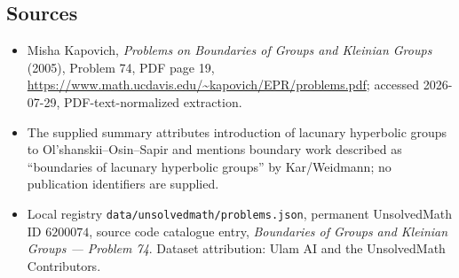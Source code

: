 \documentclass[11pt]{article}
\begin{document}
\subsection{Sources}
\begin{itemize}
\item Misha Kapovich, \emph{Problems on Boundaries of Groups and Kleinian Groups} (2005), Problem 74, PDF page 19, \url{https://www.math.ucdavis.edu/~kapovich/EPR/problems.pdf}; accessed 2026-07-29, PDF-text-normalized extraction.
\item The supplied summary attributes introduction of lacunary hyperbolic groups to Ol'shanskii--Osin--Sapir and mentions boundary work described as ``boundaries of lacunary hyperbolic groups'' by Kar/Weidmann; no publication identifiers are supplied.
\item Local registry \texttt{data/unsolvedmath/problems.json}, permanent UnsolvedMath ID $6200074$, source code catalogue entry, \emph{Boundaries of Groups and Kleinian Groups --- Problem 74}. Dataset attribution: Ulam AI and the UnsolvedMath Contributors.
\end{itemize}
\end{document}
